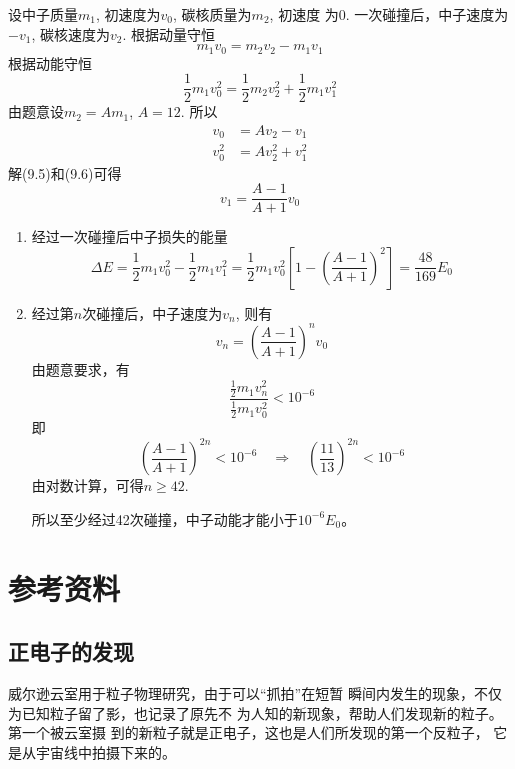 \begin{enumerate}
\begin{solution}
    设中子质量$m_1$, 初速度为$v_0$, 碳核质量为$m_2$, 初速度
    为0. 一次碰撞后，中子速度为$-v_1$, 碳核速度为$v_2$. 
    根据动量守恒
\begin{equation}
    m_1v_0=m_2v_2-m_1v_1
\end{equation}
根据动能守恒
\begin{equation}
    \frac{1}{2}m_1v_0^2=\frac{1}{2}m_2v_2^2+\frac{1}{2}m_1v_1^2
\end{equation}
由题意设$m_2=Am_1$, $A=12$. 
所以
\begin{align}
    v_0&=Av_2-v_1\\
    v^2_0&=Av^2_2+v_1^2
\end{align}
解(9.5)和(9.6)可得
\begin{equation}
v_1=\frac{A-1}{A+1}v_0
\end{equation}
\begin{enumerate}
\item 经过一次碰撞后中子损失的能量
\[\Delta E=\frac{1}{2}m_1v_0^2-\frac{1}{2}m_1v_1^2=\frac{1}{2}m_1v^2_0\left[1-\left(\frac{A-1}{A+1}\right)^2\right]=\frac{48}{169}E_0\]

\item 经过第$n$次碰撞后，中子速度为$v_n$, 则有
\[v_n=\left(\frac{A-1}{A+1}\right)^n v_0\]
由题意要求，有
\[ \frac{\frac{1}{2}m_1v_n^2}{\frac{1}{2}m_1v_0^2}<10^{-6} \]
即
\[\left(\frac{A-1}{A+1}\right)^{2n}<10^{-6}\quad \Rightarrow\quad \left(\frac{11}{13}\right)^{2n}<10^{-6}\]
由对数计算，可得$n\ge 42$. 

所以至少经过42次碰撞，中子动能才能小于$10^{-6}E_0$。
\end{enumerate}
\end{solution}
\end{enumerate}


\section{参考资料}
\subsection{正电子的发现}
威尔逊云室用于粒子物理研究，由于可以“抓拍”在短暂
瞬间内发生的现象，不仅为已知粒子留了影，也记录了原先不
为人知的新现象，帮助人们发现新的粒子。第一个被云室摄
到的新粒子就是正电子，这也是人们所发现的第一个反粒子，
它是从宇宙线中拍摄下来的。

